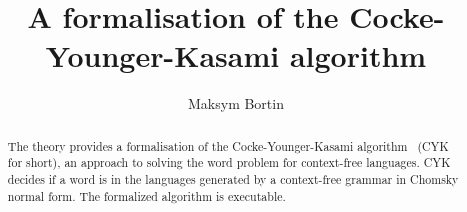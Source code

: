 \documentclass[11pt,a4paper]{article}
\begin{document}
\title{A formalisation of the Cocke-Younger-Kasami algorithm}
\author{Maksym Bortin}
\maketitle

\begin{abstract}
  The theory provides a formalisation of the Cocke-Younger-Kasami
  algorithm~\cite{Younger1967} (CYK for short), an approach to solving the
  word problem for context-free languages.  CYK decides if a word is in the
  languages generated by a context-free grammar in Chomsky normal form.
  The formalized algorithm is executable.
\end{abstract}

\tableofcontents





\end{document}
